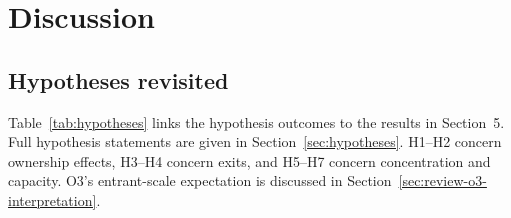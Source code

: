 \section{Discussion}
\label{sec:review-discussion}

\FloatBarrier
\subsection{Hypotheses revisited}
\label{sec:review-hypothesis-outcomes}
Table~\ref{tab:hypotheses} links the hypothesis outcomes to the results in Section~5. Full hypothesis statements are given in Section~\ref{sec:hypotheses}. H1--H2 concern ownership effects, H3--H4 concern exits, and H5--H7 concern concentration and capacity. O3's entrant-scale expectation is discussed in Section~\ref{sec:review-o3-interpretation}.
\par
\begingroup
\flowtablestyle
\centering
\fontsize{10}{12}\selectfont{}\setlength{\tabcolsep}{4pt}\renewcommand{\arraystretch}{1.15}
